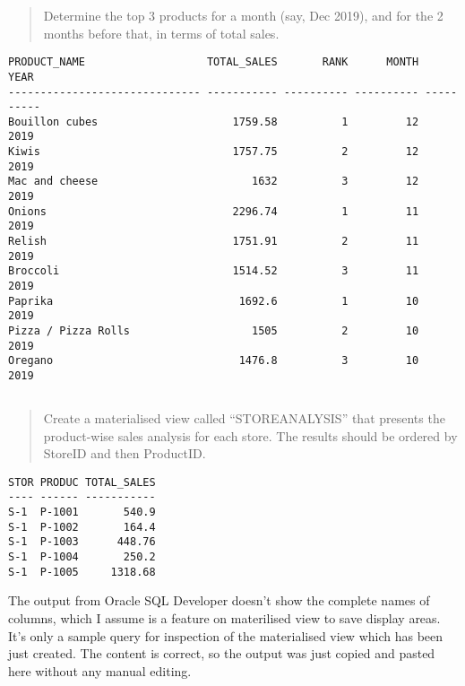 \documentclass[
  a4paper,
]{article}
\newcommand{\sqloutputbegin}{
        \hspace{0.5cm}
        \begin{minipage}[c]{0.93\linewidth} 
        \centering
        \begin{tcolorbox}[colback=gray!8, colframe=white,
            boxrule=0pt, coltitle=black,
            colbacktitle=gray!15, title={SQL Output}]
        \centering
        \small}
\newcommand{\sqloutputend}{
        \end{tcolorbox} 
        \end{minipage}}
\begin{document}
\begin{quote}
Determine the top 3 products for a month (say, Dec 2019), and for the 2
months before that, in terms of total sales.
\end{quote}

\sqloutputbegin

\begin{verbatim}
PRODUCT_NAME                   TOTAL_SALES       RANK      MONTH       YEAR
------------------------------ ----------- ---------- ---------- ----------
Bouillon cubes                     1759.58          1         12       2019
Kiwis                              1757.75          2         12       2019
Mac and cheese                        1632          3         12       2019
Onions                             2296.74          1         11       2019
Relish                             1751.91          2         11       2019
Broccoli                           1514.52          3         11       2019
Paprika                             1692.6          1         10       2019
Pizza / Pizza Rolls                   1505          2         10       2019
Oregano                             1476.8          3         10       2019
\end{verbatim}

\sqloutputend

\hypertarget{section-3}{%
\subsection{}\label{section-3}}

\begin{quote}
Create a materialised view called ``STOREANALYSIS'' that presents the
product-wise sales analysis for each store. The results should be
ordered by StoreID and then ProductID.
\end{quote}

\sqloutputbegin

\begin{verbatim}
STOR PRODUC TOTAL_SALES
---- ------ -----------
S-1  P-1001       540.9
S-1  P-1002       164.4
S-1  P-1003      448.76
S-1  P-1004       250.2
S-1  P-1005     1318.68
\end{verbatim}

\sqloutputend

The output from Oracle SQL Developer doesn't show the complete names of
columns, which I assume is a feature on materilised view to save display
areas. It's only a sample query for inspection of the materialised view
which has been just created. The content is correct, so the output was
just copied and pasted here without any manual editing.
\end{document}
